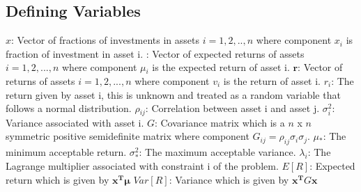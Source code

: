 \documentclass[11pt]{article}
\begin{document}
\subsection{Defining Variables}
{\boldmath$x$}: Vector of fractions of investments in assets $i=1,2,..,n$ where component $x$$_i$ is fraction of investment in asset i.
\newline {\boldmath$\mu$}: Vector of expected returns of assets $i=1,2,...,n$ where component $\mu$$_i$ is the expected return of asset i.
\newline $\mathbf{r}$: Vector of returns of assets $i=1,2,...,n$ where component $v$$_i$ is the return of asset i.
\newline $r$$_i$: The return given by asset i, this is unknown and treated as a random variable that follows a normal distribution.
\newline $\rho$$_{ij}$: Correlation between asset i and asset j.
\newline $\sigma$$_i^2$: Variance associated with asset i.
\newline $G$: Covariance matrix which is a $n$ x $n$ symmetric positive semidefinite matrix where component $G_{ij}=\rho_{ij}\sigma_i\sigma_j$.
\newline  $\mu$$_*$: The minimum acceptable return.
\newline  $\sigma_*^2$: The maximum acceptable variance.
\newline $\lambda_i$: The Lagrange multiplier associated with constraint i of the problem.
\newline $E[R]$: Expected return which is given by $\mathbf{x^T}\boldsymbol\mu$
\newline $Var[R]$: Variance which is given by $\mathbf{x^T}G\mathbf{x}$
\end{document}
